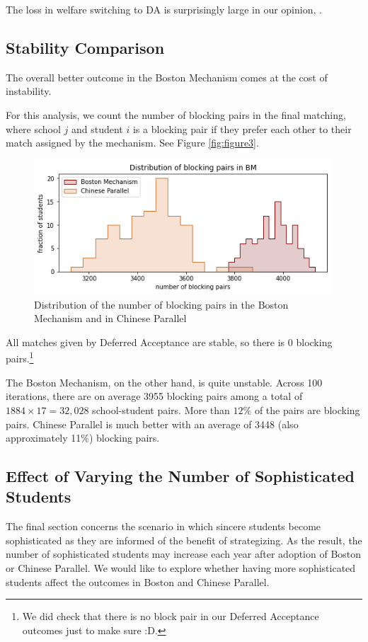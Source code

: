 \documentclass[10pt, reqno]{amsart}
\begin{document}
The loss in welfare switching to DA is surprisingly large in our opinion, .


\subsection{Stability Comparison}
The overall better outcome in the Boston Mechanism comes at the cost of instability. 

For this analysis, we count the number of blocking pairs in the final matching, where school $j$ and student $i$ is a blocking pair if they prefer each other to their match assigned by the mechanism. See Figure \ref{fig:figure3}.

\begin{figure}[h]
  \centering
  \includegraphics[width=0.99\textwidth]{../figures/blocking_pairs_hist_p2.png}
  \caption{Distribution of the number of blocking pairs in the Boston Mechanism and in Chinese Parallel}
  \label{fig:figure4}
\end{figure}

All matches given by Deferred Acceptance are stable, so there is 0 blocking pairs.\footnote{We did check that there is no block pair in our Deferred Acceptance outcomes just to make sure :D.}

The Boston Mechanism, on the other hand, is quite unstable. Across 100 iterations, there are on average 3955 blocking pairs among a total of $1884\times17=32,028$ school-student pairs. More than $12\%$ of the pairs are blocking pairs. Chinese Parallel is much better with an average of 3448 (also approximately 11\%) blocking pairs. 

\subsection{Effect of Varying the Number of Sophisticated Students}
The final section concerns the scenario in which sincere students become sophisticated as they are informed of the benefit of strategizing. As the result, the number of sophisticated students may increase each year after adoption of Boston or Chinese Parallel. We would like to explore whether having more sophisticated students affect the outcomes in Boston and Chinese Parallel. 
\end{document}
